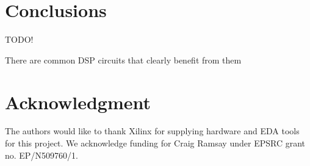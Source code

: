 \documentclass[conference]{IEEEtran}
\begin{document}
\section{Conclusions}

TODO!

There are common DSP circuits that clearly benefit from them

\section*{Acknowledgment}

The authors would like to thank Xilinx for supplying hardware and EDA tools for
this project. We acknowledge funding for Craig Ramsay under EPSRC grant no.
EP/N509760/1.


 
\end{document}
